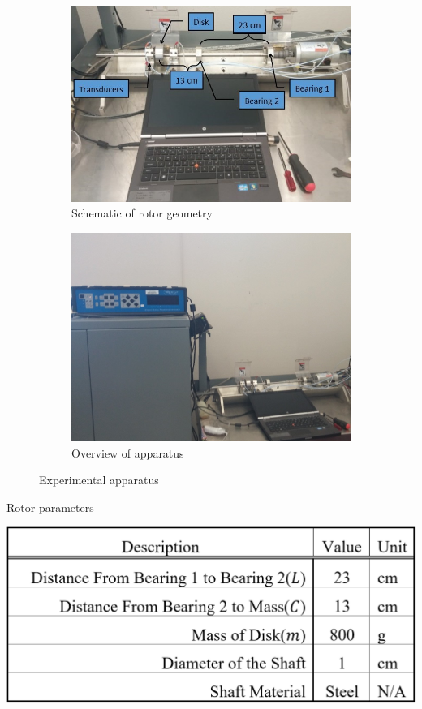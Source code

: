 		\begin{figure}[H]
			\begin{subfigure}[b]{.5\textwidth}
				\centering
				\includegraphics[width=.95\linewidth]{./figures/Images/Figure_3.jpg}
				\caption{Schematic of rotor geometry}
				\label{fig:Figure_3a}
				\centering
			\end{subfigure} %
			\begin{subfigure}[b]{.5\textwidth}
				\centering
				\includegraphics[width=.95\linewidth]{./figures/Images/Figure_3b.jpg}
				\caption{Overview of apparatus}
				\label{fig:Figure_3b}
				\centering
			\end{subfigure}
			\caption{Experimental apparatus}
			\label{fig:Figure_3}
		\end{figure}
		\begin{table}[H]
			\centering
			\caption{Rotor parameters}
			\includegraphics[scale=.25]{./figures/Images/Table_1}
			\label{tab:Table_1}
			\centering
		\end{table}
